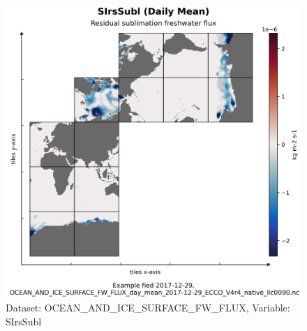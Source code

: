 \begin{figure}[H]
\centering
\includegraphics[scale=0.55]{../images/plots/native_plots/Ocean_and_Sea-Ice_Surface_Freshwater_Fluxes/SIrsSubl.png}
\caption{Dataset: OCEAN\_AND\_ICE\_SURFACE\_FW\_FLUX, Variable: SIrsSubl}
\label{tab:table-OCEAN_AND_ICE_SURFACE_FW_FLUX_SIrsSubl-Plot}
\end{figure}
\pagebreak
